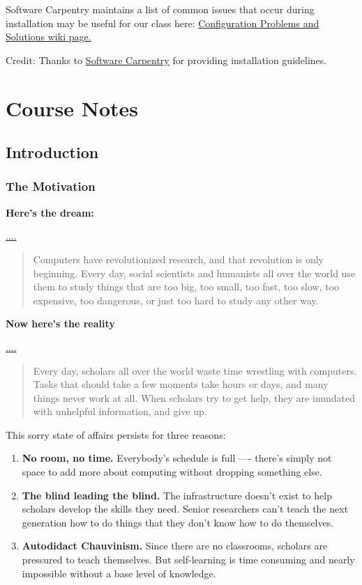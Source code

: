 \documentclass[]{book}
\begin{document}
Software Carpentry maintains a list of common issues that occur during
installation may be useful for our class here:
\href{https://github.com/swcarpentry/workshop-template/wiki/Configuration-Problems-and-Solutions}{Configuration
Problems and Solutions wiki page.}

Credit: Thanks to
\href{http://software-carpentry.org/workshops/}{Software Carpentry} for
providing installation guidelines.

\part{Course Notes}\label{part-course-notes}

\chapter{Introduction}\label{introduction}

\section{The Motivation}\label{the-motivation}

\textbf{Here's the dream:}

\url{....}

\begin{quote}
Computers have revolutionized research, and that revolution is only
beginning. Every day, social scientists and humanists all over the world
use them to study things that are too big, too small, too fast, too
slow, too expensive, too dangerous, or just too hard to study any other
way.
\end{quote}

\textbf{Now here's the reality}

\url{....}

\begin{quote}
Every day, scholars all over the world waste time wrestling with
computers. Tasks that should take a few moments take hours or days, and
many things never work at all. When scholars try to get help, they are
inundated with unhelpful information, and give up.
\end{quote}

This sorry state of affairs persists for three reasons:

\begin{enumerate}
\def\labelenumi{\arabic{enumi}.}
\item
  \textbf{No room, no time.} Everybody's schedule is full ---- there's
  simply not space to add more about computing without dropping
  something else.
\item
  \textbf{The blind leading the blind.} The infrastructure doesn't exist
  to help scholars develop the skills they need. Senior researchers
  can't teach the next generation how to do things that they don't know
  how to do themselves.
\item
  \textbf{Autodidact Chauvinism.} Since there are no classrooms,
  scholars are pressured to teach themselves. But self-learning is time
  consuming and nearly impossible without a base level of knowledge.
\end{enumerate}
\end{document}
